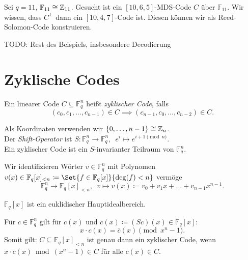 \documentclass{cheat-sheet}
\newcommand{\F}{\mathbb{F}} %
\begin{document}
\begin{bsp}
  Sei $q = 11$, $\F_{11} \cong \Z_{11}$.
  Gesucht ist ein $[10, 6, 5]$-MDS-Code $C$ über $\F_{11}$.
  Wir wissen, dass $C^\perp$ dann ein $[10, 4, 7]$-Code ist.
  Diesen können wir als Reed-Solomon-Code konstruieren.
\end{bsp}

TODO: Rest des Beispiels, insbesondere Decodierung


\section{Zyklische Codes}


\begin{defn}
  Ein linearer Code $C \subseteq \F_q^n$ heißt \emph{zyklischer Code}, falls
  \[
    (c_0, c_1, \ldots, c_{n-1}) \in C \implies
    (c_{n-1}, c_0, \ldots, c_{n-2}) \in C.
  \]
\end{defn}

\begin{bem}
  Als Koordinaten verwenden wir $\{ 0, \ldots, n-1 \} \cong \mathbb{Z}_n$. \\
  Der \emph{Shift-Operator} ist $S : \F_q^n \to \F_q^n, \enspace e^i \mapsto e^{i+1 \pmod{n}}$. \\
  Ein zyklischer Code ist ein $S$-invarianter Teilraum von $\F_q^n$.
\end{bem}

\begin{nota}
  Wir identifizieren Wörter $v \in \F_q^n$ mit Polynomen $v(x) \in \F_q[x]_{< n} \coloneqq \Set{f \in \F_q[x]}{\deg(f) < n}$ vermöge
  \[
    \F_q^n \to \F_q[x]_{< n}, \enspace
    v \mapsto v(x) \coloneqq v_0 + v_1 x + \ldots + v_{n-1} x^{n-1}.
  \]
\end{nota}

\begin{fakt}
  $\F_q[x]$ ist ein euklidischer Hauptidealbereich.
\end{fakt}

\begin{bem}
  Für $c \in \F_q^n$ gilt für $c(x)$ und $ \overline{c}(x) \coloneqq (S c)(x) \in \F_q[x]$:
  \[
    x \cdot c(x) = \overline{c}(x) \pmod{x^n - 1}.
  \]
  Somit gilt: $C \subseteq \F_q[x]_{< n}$ ist genau dann ein zyklischer Code, wenn $x \cdot c(x) \bmod{(x^n - 1)} \in C$ für alle $c(x) \in C$.
\end{bem}
\end{document}
